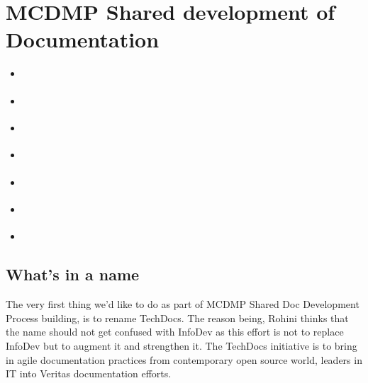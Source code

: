 \documentclass[letterpaper,10pt,english]{sphinxmanual}
\begin{document}
\chapter{MCDMP Shared development of Documentation}
\label{\detokenize{mcdmp_docx_res:docx-resources}}\label{\detokenize{mcdmp_docx_res:content-all-mcdmp-doc-process}}\label{\detokenize{mcdmp_docx_res:docx-res}}\label{\detokenize{mcdmp_docx_res:mcdmp-shared-development-of-documentation}}
\begin{sphinxShadowBox}
\begin{itemize}
\item {} 
\label{\detokenize{mcdmp_docx_res:id28}}{\hyperref[\detokenize{mcdmp_docx_res:what-s-in-a-name}]{}}

\item {} 
\label{\detokenize{mcdmp_docx_res:id29}}{\hyperref[\detokenize{mcdmp_docx_res:objective}]{}}

\item {} 
\label{\detokenize{mcdmp_docx_res:id30}}{\hyperref[\detokenize{mcdmp_docx_res:shared-doc-development-process-highlights}]{}}

\item {} 
\label{\detokenize{mcdmp_docx_res:id31}}{\hyperref[\detokenize{mcdmp_docx_res:how-it-works}]{}}

\item {} 
\label{\detokenize{mcdmp_docx_res:id32}}{\hyperref[\detokenize{mcdmp_docx_res:how-to-contribute}]{}}

\item {} 
\label{\detokenize{mcdmp_docx_res:id33}}{\hyperref[\detokenize{mcdmp_docx_res:use-cases-applying-model-to-mcdmp-documentation-workflows}]{}}

\item {} 
\label{\detokenize{mcdmp_docx_res:id34}}{\hyperref[\detokenize{mcdmp_docx_res:feedback-on-how-to-improve}]{}}

\end{itemize}
\end{sphinxShadowBox}


\section{What’s in a name}
\label{\detokenize{mcdmp_docx_res:what-s-in-a-name}}
The very first thing we’d like to do as part of MCDMP Shared Doc Development Process building, is to rename TechDocs.  The reason being, Rohini thinks that the name should not get confused with InfoDev as this effort is not to replace InfoDev but to augment it and strengthen it.  The TechDocs initiative is to bring in agile documentation practices from contemporary open source world, leaders in IT into Veritas documentation efforts.
\end{document}
